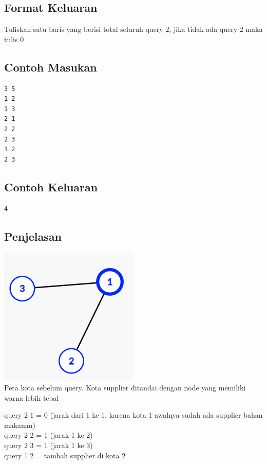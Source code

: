 \documentclass{article}
\begin{document}
\subsection*{Format Keluaran}
Tuliskan satu baris yang berisi total seluruh query 2, jika tidak ada query 2 maka tulis 0
\\

\begin{multicols}{2}
\subsection*{Contoh Masukan}
\begin{lstlisting}
3 5
1 2
1 3
2 1
2 2
2 3
1 2
2 3
\end{lstlisting}
\columnbreak
\subsection*{Contoh Keluaran}
\begin{lstlisting}
4
\end{lstlisting}
\vfill
\null
\end{multicols}



\pagebreak

\subsection*{Penjelasan}

\begin{center}

\includegraphics{pertama.PNG}    \\
Peta kota sebelum query. Kota supplier ditandai dengan node yang memiliki warna lebih tebal
\end{center}
query 2 1 = 0 (jarak dari 1 ke 1, karena kota 1 awalnya sudah ada supplier bahan makanan)\\
query 2 2 = 1 (jarak 1 ke 2)\\
query 2 3 = 1 (jarak 1 ke 3)\\
query 1 2 = tambah supplier di kota 2\\
\end{document}

